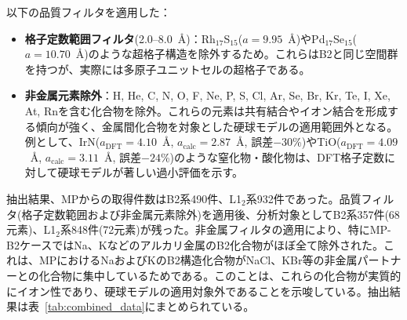 \documentclass[a4paper,10pt,5p]{elsarticle}
\begin{document}
以下の品質フィルタを適用した：
\begin{itemize}
\setlength{\parskip}{0cm}
\setlength{\itemsep}{0cm}
    \item \textbf{格子定数範囲フィルタ}(2.0--8.0~\AA)：Rh$_{17}$S$_{15}$($a = 9.95$~\AA)やPd$_{17}$Se$_{15}$($a = 10.70$~\AA)のような超格子構造を除外するため。これらはB2と同じ空間群を持つが、実際には多原子ユニットセルの超格子である。
    \item \textbf{非金属元素除外}：H, He, C, N, O, F, Ne, P, S, Cl, Ar, Se, Br, Kr, Te, I, Xe, At, Rnを含む化合物を除外。これらの元素は共有結合やイオン結合を形成する傾向が強く、金属間化合物を対象とした硬球モデルの適用範囲外となる。例として、IrN($a_{\mathrm{DFT}} = 4.10$~\AA, $a_{\mathrm{calc}} = 2.87$~\AA, 誤差$-30$\%)やTiO($a_{\mathrm{DFT}} = 4.09$~\AA, $a_{\mathrm{calc}} = 3.11$~\AA, 誤差$-24$\%)のような窒化物・酸化物は、DFT格子定数に対して硬球モデルが著しい過小評価を示す。
\end{itemize}



抽出結果、MPからの取得件数はB2系490件、L1$_2$系932件であった。品質フィルタ(格子定数範囲および非金属元素除外)を適用後、分析対象としてB2系357件(68元素)、L1$_2$系848件(72元素)が残った。非金属フィルタの適用により、特にMP-B2ケースではNa、Kなどのアルカリ金属のB2化合物がほぼ全て除外された。これは、MPにおけるNaおよびKのB2構造化合物がNaCl、KBr等の非金属パートナーとの化合物に集中しているためである。このことは、これらの化合物が実質的にイオン性であり、硬球モデルの適用対象外であることを示唆している。抽出結果は表~\ref{tab:combined_data}にまとめられている。
\end{document}
